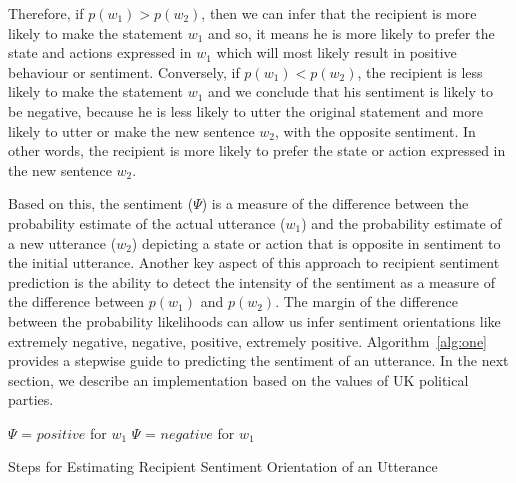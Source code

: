 Therefore, if $p(w_1)> p(w_2)$, then we can infer that the recipient is more likely to make the statement $w_1$ and so, it means he is more likely to prefer the state and actions expressed in $w_1$ which will most likely result in positive behaviour or sentiment. Conversely, if $p(w_1) < p(w_2)$, the recipient is less likely to make the statement $w_1$ and we conclude that his sentiment is likely to be negative, because he is less likely to utter the original statement and more likely to utter or make the new sentence $w_2$, with the opposite sentiment. In other words, the recipient is more likely to prefer the state or action expressed in the new sentence $w_2$. 


Based on this, the sentiment ($\Psi$) is a measure of the difference between the probability estimate of the actual utterance ($w_1$) and the probability estimate of a new utterance ($w_2$) depicting a state or action that is opposite in sentiment to the initial utterance.
Another key aspect of this approach to recipient sentiment prediction is the ability to detect the intensity of the sentiment as a measure of the difference between $p(w_1)$ and $p(w_2)$. The margin of the difference between the probability likelihoods can allow us infer sentiment orientations like extremely negative, negative, positive, extremely positive. Algorithm~\ref{alg:one} provides a stepwise guide to predicting the sentiment of an utterance. In the next section, we describe an implementation based on the values of UK political parties.

\begin{algorithm}[t]
\SetAlgoNoLine
{}
{$\Psi$ = $positive$ for $w_1$}
{$\Psi$ = $negative$ for $w_1$}


\caption{Steps for Estimating Recipient Sentiment Orientation of an Utterance}
\label{alg:one}
\end{algorithm}

